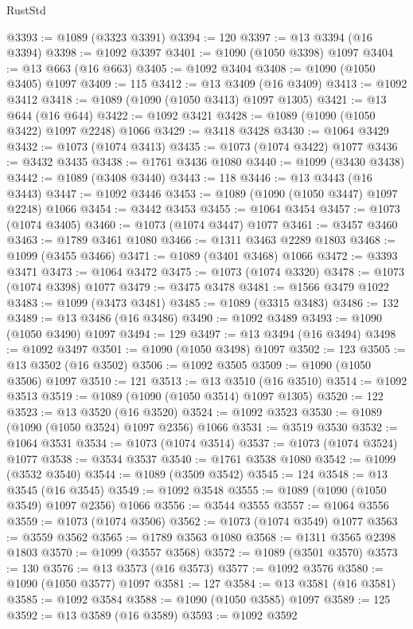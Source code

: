 \begin{lexlean}{RustStd}
\begin{coremodule}
{\begin{coremodule}
{{{{{{{{{{{{{{@3393 := @1089 (@3323 @3391)
@3394 := 120
@3397 := @13 @3394 (@16 @3394)
@3398 := @1092 @3397
@3401 := @1090 (@1050 @3398) @1097
@3404 := @13 @663 (@16 @663)
@3405 := @1092 @3404
@3408 := @1090 (@1050 @3405) @1097
@3409 := 115
@3412 := @13 @3409 (@16 @3409)
@3413 := @1092 @3412
@3418 := @1089 (@1090 (@1050 @3413) @1097 @1305)
@3421 := @13 @644 (@16 @644)
@3422 := @1092 @3421
@3428 := @1089 (@1090 (@1050 @3422) @1097 @2248) @1066
@3429 := @3418 @3428
@3430 := @1064 @3429
@3432 := @1073 (@1074 @3413)
@3435 := @1073 (@1074 @3422) @1077
@3436 := @3432 @3435
@3438 := @1761 @3436 @1080
@3440 := @1099 (@3430 @3438)
@3442 := @1089 (@3408 @3440)
@3443 := 118
@3446 := @13 @3443 (@16 @3443)
@3447 := @1092 @3446
@3453 := @1089 (@1090 (@1050 @3447) @1097 @2248) @1066
@3454 := @3442 @3453
@3455 := @1064 @3454
@3457 := @1073 (@1074 @3405)
@3460 := @1073 (@1074 @3447) @1077
@3461 := @3457 @3460
@3463 := @1789 @3461 @1080
@3466 := @1311 @3463 @2289 @1803
@3468 := @1099 (@3455 @3466)
@3471 := @1089 (@3401 @3468) @1066
@3472 := @3393 @3471
@3473 := @1064 @3472
@3475 := @1073 (@1074 @3320)
@3478 := @1073 (@1074 @3398) @1077
@3479 := @3475 @3478
@3481 := @1566 @3479 @1022
@3483 := @1099 (@3473 @3481)
@3485 := @1089 (@3315 @3483)
@3486 := 132
@3489 := @13 @3486 (@16 @3486)
@3490 := @1092 @3489
@3493 := @1090 (@1050 @3490) @1097
@3494 := 129
@3497 := @13 @3494 (@16 @3494)
@3498 := @1092 @3497
@3501 := @1090 (@1050 @3498) @1097
@3502 := 123
@3505 := @13 @3502 (@16 @3502)
@3506 := @1092 @3505
@3509 := @1090 (@1050 @3506) @1097
@3510 := 121
@3513 := @13 @3510 (@16 @3510)
@3514 := @1092 @3513
@3519 := @1089 (@1090 (@1050 @3514) @1097 @1305)
@3520 := 122
@3523 := @13 @3520 (@16 @3520)
@3524 := @1092 @3523
@3530 := @1089 (@1090 (@1050 @3524) @1097 @2356) @1066
@3531 := @3519 @3530
@3532 := @1064 @3531
@3534 := @1073 (@1074 @3514)
@3537 := @1073 (@1074 @3524) @1077
@3538 := @3534 @3537
@3540 := @1761 @3538 @1080
@3542 := @1099 (@3532 @3540)
@3544 := @1089 (@3509 @3542)
@3545 := 124
@3548 := @13 @3545 (@16 @3545)
@3549 := @1092 @3548
@3555 := @1089 (@1090 (@1050 @3549) @1097 @2356) @1066
@3556 := @3544 @3555
@3557 := @1064 @3556
@3559 := @1073 (@1074 @3506)
@3562 := @1073 (@1074 @3549) @1077
@3563 := @3559 @3562
@3565 := @1789 @3563 @1080
@3568 := @1311 @3565 @2398 @1803
@3570 := @1099 (@3557 @3568)
@3572 := @1089 (@3501 @3570)
@3573 := 130
@3576 := @13 @3573 (@16 @3573)
@3577 := @1092 @3576
@3580 := @1090 (@1050 @3577) @1097
@3581 := 127
@3584 := @13 @3581 (@16 @3581)
@3585 := @1092 @3584
@3588 := @1090 (@1050 @3585) @1097
@3589 := 125
@3592 := @13 @3589 (@16 @3589)
@3593 := @1092 @3592
}}}}}}}}}}}}}}
\end{coremodule}}
\end{coremodule}
\end{lexlean}
